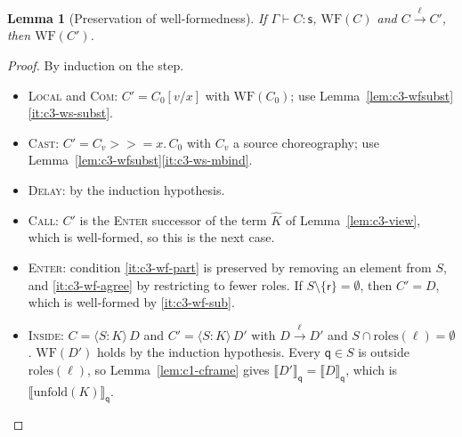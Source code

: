\documentclass[11pt]{report}
\theoremstyle{plain}
\newtheorem{lemma}[theorem]{Lemma}
\theoremstyle{definition}
\theoremstyle{remark}
\newcommand{\qq}{\mathsf{q}}
\newcommand{\rr}{\mathsf{r}}
\newcommand{\sr}{\mathsf{s}}
\newcommand{\mbind}[3]{#1 \mathbin{>\!\!>\!\!=} #2.\,#3}
\newcommand{\rt}[3]{\langle #1 : #2\rangle\,#3}
\newcommand{\unfold}[1]{\mathrm{unfold}(#1)}
\newcommand{\roles}[1]{\mathrm{roles}(#1)}
\newcommand{\WF}{\mathrm{WF}}
\newcommand{\lto}[1]{\xrightarrow{\;#1\;}}
\newcommand{\proj}[2]{\llbracket #1 \rrbracket_{#2}}
\newcommand{\rn}[1]{{\normalfont\scshape #1}}
\begin{document}
\begin{lemma}[Preservation of well-formedness]\label{lem:c3-wfpres}
  If $\Gamma\vdash C:\sr$, $\WF(C)$ and $C\lto{\ell}C'$, then $\WF(C')$.
\end{lemma}
\begin{proof}
  By induction on the step.
  \begin{itemize}[nosep]
  \item \rn{Local} and \rn{Com}: $C'=C_0[v/x]$ with $\WF(C_0)$; use
    Lemma~\ref{lem:c3-wfsubst}\ref{it:c3-ws-subst}.
  \item \rn{Cast}: $C'=\mbind{C_v}{x}{C_0}$ with $C_v$ a source choreography;
    use Lemma~\ref{lem:c3-wfsubst}\ref{it:c3-ws-mbind}.
  \item \rn{Delay}: by the induction hypothesis.
  \item \rn{Call}: $C'$ is the \rn{Enter} successor of the term $\widehat{K}$ of
    Lemma~\ref{lem:c3-view}, which is well-formed, so this is the next case.
  \item \rn{Enter}: condition \ref{it:c3-wf-part} is preserved by removing an
    element from $S$, and \ref{it:c3-wf-agree} by restricting to fewer
    roles.  If $S\setminus\{\rr\}=\emptyset$, then $C'=D$, which is
    well-formed by \ref{it:c3-wf-sub}.
  \item \rn{Inside}: $C=\rt{S}{K}{D}$ and $C'=\rt{S}{K}{D'}$ with
    $D\lto{\ell}D'$ and $S\cap\roles{\ell}=\emptyset$.  $\WF(D')$ holds by the
    induction hypothesis.  Every $\qq\in S$ is outside $\roles{\ell}$, so
    Lemma~\ref{lem:c1-cframe} gives
    $\proj{D'}{\qq}=\proj{D}{\qq}$, which is $\proj{\unfold{K}}{\qq}$.\qedhere
  \end{itemize}
\end{proof}
\end{document}
